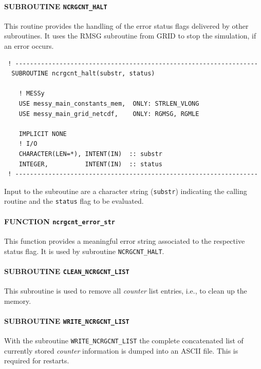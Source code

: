 \documentclass[11pt,twoside]{report}
\begin{document}
\paragraph{SUBROUTINE \color{blue} \tt\bf NCRGCNT\_HALT\\ \label{IGCNTHALT}} 

\par\noindent This routine provides the handling of the error status flags delivered by other subroutines.
It uses the RMSG subroutine from GRID to stop the simulation, if an
error occurs.
\begin{verbatim}
 ! ------------------------------------------------------------------
  SUBROUTINE ncrgcnt_halt(substr, status)

    ! MESSy
    USE messy_main_constants_mem,  ONLY: STRLEN_VLONG
    USE messy_main_grid_netcdf,    ONLY: RGMSG, RGMLE
    
    IMPLICIT NONE
    ! I/O
    CHARACTER(LEN=*), INTENT(IN)  :: substr
    INTEGER,          INTENT(IN)  :: status
 ! ------------------------------------------------------------------
\end{verbatim}
Input to the subroutine are a character string (\verb|substr|) indicating
the calling routine and the \verb|status| flag to be evaluated.

\paragraph{FUNCTION \color{blue} \tt\bf ncrgcnt\_error\_str\\ \label{IGCNTERRSTR}}
This function provides a meaningful error string associated to the respective status flag.
It is used by subroutine \verb|NCRGCNT_HALT|.

\paragraph{SUBROUTINE \color{blue} \tt\bf CLEAN\_NCRGCNT\_LIST\\ \label{IGCNTLISTCLEAN}}
This subroutine is used to remove all
{\it counter} list entries, i.e., to clean up the memory.

\paragraph{SUBROUTINE \color{blue} \tt\bf WRITE\_NCRGCNT\_LIST\\\label{IGCNTLISTWRITE}}
With the subroutine \verb|WRITE_NCRGCNT_LIST| the complete
 concatenated list of currently stored {\it counter} information is
 dumped into an ASCII file. This is required for restarts.
\end{document}
